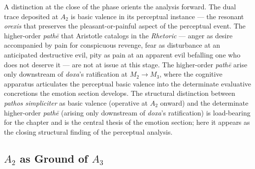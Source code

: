 A distinction at the close of the phase orients the analysis forward. The dual trace deposited at $A_2$ is basic valence in its perceptual instance --- the resonant \textit{orexis} that preserves the pleasant-or-painful aspect of the perceptual event. The higher-order \textit{pathē} that Aristotle catalogs in the \textit{Rhetoric} --- anger as desire accompanied by pain for conspicuous revenge, fear as disturbance at an anticipated destructive evil, pity as pain at an apparent evil befalling one who does not deserve it --- are not at issue at this stage. The higher-order \textit{pathē} arise only downstream of \textit{doxa}'s ratification at $M_2 \rightarrow M_3$, where the cognitive apparatus articulates the perceptual basic valence into the determinate evaluative concretions the emotion section develops. The structural distinction between \textit{pathos simpliciter} as basic valence (operative at $A_2$ onward) and the determinate higher-order \textit{pathē} (arising only downstream of \textit{doxa}'s ratification) is load-bearing for the chapter and is the central thesis of the emotion section; here it appears as the closing structural finding of the perceptual analysis.

\subsection{$A_2$ as Ground of $A_3$}


